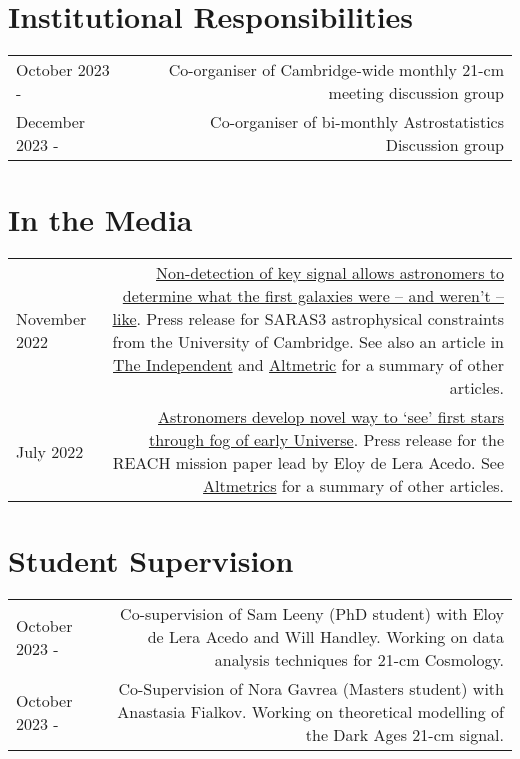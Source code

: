 \documentclass{article}
\begin{document}
\section*{Institutional Responsibilities}

\begin{tabular}{L!{\vrule}R}
    October 2023 - & Co-organiser of Cambridge-wide monthly 21-cm meeting discussion group \\
    December 2023 - & Co-organiser of bi-monthly Astrostatistics Discussion group \\
\end{tabular}

\section*{In the Media}

\begin{tabular}{L!{\vrule}R}
	November 2022 & \href{https://www.cam.ac.uk/research/news/non-detection-of-key-signal-allows-astronomers-to-determine-what-the-first-galaxies-were-and-werent}{Non-detection of key signal allows astronomers to determine what the first galaxies were – and weren’t – like}. Press release for SARAS3 astrophysical constraints from the University of Cambridge. See also an article in \href{https://www.independent.co.uk/space/galaxies-beginning-cosmic-dawn-signal-b2234570.html?amp}{The Independent} and \href{https://nature.altmetric.com/details/139089769/news}{Altmetric} for a summary of other articles. \\
	July 2022 & \href{https://www.cam.ac.uk/research/news/astronomers-develop-novel-way-to-see-the-first-stars-through-the-fog-of-the-early-universe}{Astronomers develop novel way to ‘see’ first stars through fog of early Universe}. Press release for the REACH mission paper lead by Eloy de Lera Acedo. See \href{https://nature.altmetric.com/details/132932581/news}{Altmetrics} for a summary of other articles.
\end{tabular}

\section*{Student Supervision}

\begin{tabular}{L!{\vrule}R}
	October 2023 - & Co-supervision of Sam Leeny (PhD student) with Eloy de Lera Acedo and Will Handley. Working on data analysis techniques for 21-cm Cosmology. \\
	October 2023 - & Co-Supervision of Nora Gavrea (Masters student) with Anastasia Fialkov. Working on theoretical modelling of the Dark Ages 21-cm signal. \\
\end{tabular}
\end{document}
